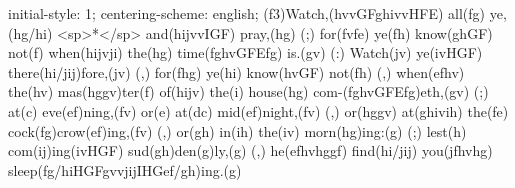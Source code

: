 initial-style: 1;
centering-scheme: english;
(f3)Watch,(hvvGFghivvHFE) all(fg) ye,(hg/hi) <sp>*</sp> and(hijvvIGF) pray,(hg) (;) for(fvfe) ye(fh) know(ghGF) not(f) when(hijvji) the(hg) time(fghvGFEfg) is.(gv) (:) Watch(jv) ye(ivHGF) there(hi/jij)fore,(jv) (,) for(fhg) ye(hi) know(hvGF) not(fh) (,) when(efhv) the(hv) mas(hggv)ter(f) of(hijv) the(i) house(hg) com-(fghvGFEfg)eth,(gv) (;) at(c) eve(ef)ning,(fv) or(e) at(dc) mid(ef)night,(fv) (,) or(hggv) at(ghivih) the(fe) cock(fg)crow(ef)ing,(fv) (,) or(gh) in(ih) the(iv) morn(hg)ing:(g) (;) lest(h) com(ij)ing(ivHGF) sud(gh)den(g)ly,(g) (,) he(efhvhggf) find(hi/jij) you(jfhvhg) sleep(fg/hiHGFgvvjijIHGef/gh)ing.(g)
